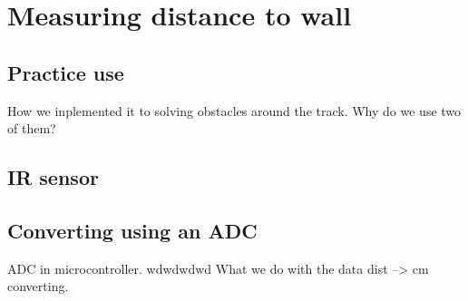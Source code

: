 \chapter{Measuring distance to wall}
\label{chap:wall_dist}


\section{Practice use}
How we inplemented it to solving obstacles around the track.
Why do we use two of them?

\section{IR sensor}



\section{Converting using an ADC}
ADC in microcontroller.
wdwdwdwd
What we do with the data  dist --> cm converting.




